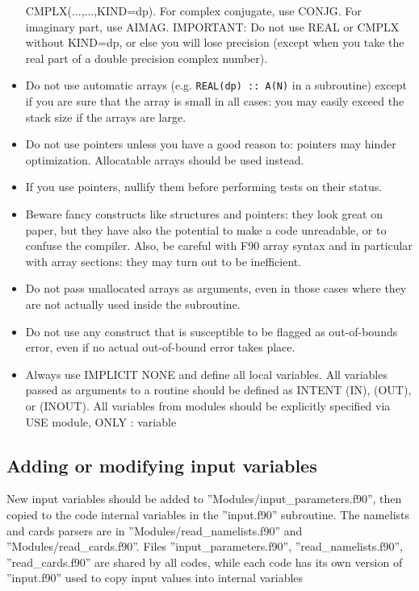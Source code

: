 \documentclass[12pt,a4paper]{article}
\begin{document}
\begin{itemize}
CMPLX(...,...,KIND=dp). For complex conjugate, use CONJG.  For imaginary part, 
use AIMAG.  IMPORTANT: Do not use REAL or CMPLX without KIND=dp, or else you 
will lose precision (except when you take the real part of a 
double precision complex number).
\item Do not use automatic arrays (e.g. \texttt{REAL(dp) :: A(N)} 
in a subroutine) except if you are sure that the array is small in all
cases: you may easily exceed the stack size if the arrays are large.
\item Do not use pointers unless you have a good reason to: 
pointers may hinder optimization. Allocatable arrays should be used instead.
\item If you use pointers, nullify them before performing tests on their
status.
\item Beware fancy constructs like structures and pointers:
they look great on paper, but they have also the potential
to make a code unreadable, or to confuse the compiler.
Also, be careful with F90 array syntax and in particular with
array sections: they may turn out to be inefficient.
\item Do not pass unallocated arrays as arguments, even in those cases where
they are not actually used inside the subroutine.
\item Do not use any construct that is susceptible to be flagged as 
out-of-bounds error, even if no actual out-of-bound error takes place.
\item Always use IMPLICIT NONE and define all local variables.
All variables passed as arguments to a routine should be defined as 
INTENT (IN), (OUT), or (INOUT). All variables from modules should be
explicitly specified via USE module, ONLY : variable
\end{itemize}

\subsection{Adding or modifying input variables}

New input variables should be added to 
''Modules/input\_parameters.f90'',
then copied to the code internal variables in the ''input.f90''
subroutine. The namelists and cards parsers are in
''Modules/read\_namelists.f90'' and ''Modules/read\_cards.f90''.
Files ''input\_parameters.f90'', ''read\_namelists.f90'',
''read\_cards.f90'' are shared by all codes, while each code
has its own version of ''input.f90''  used to copy input values
into internal variables
\end{document}
